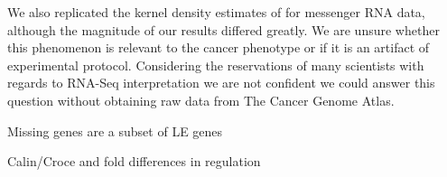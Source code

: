 \documentclass[12pt]{report}
\begin{document}
  We also replicated the kernel density estimates of \cite{Hebenstreit2011} for messenger RNA data, although the
  magnitude of our results differed greatly. We are unsure whether this phenomenon is relevant to the cancer phenotype or if it is an artifact of experimental protocol. Considering the reservations of
  many scientists with regards to RNA-Seq interpretation we are not confident we could answer this question without obtaining raw data from The Cancer Genome Atlas.
  
  
  Missing genes are a subset of LE genes


Calin/Croce and fold differences in regulation



\end{document}
